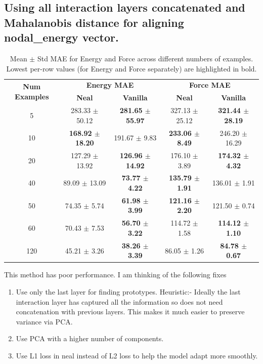\documentclass[12pt]{article}
\theoremstyle{definition}
\theoremstyle{remark}
\begin{document}
\subsection{Using all interaction layers concatenated and Mahalanobis distance for aligning nodal\_energy vector. }
\begin{table}[h!]
\centering
\caption{Mean $\pm$ Std MAE for Energy and Force across different numbers of examples. Lowest per-row values (for Energy and Force separately) are highlighted in bold.}
\renewcommand{\arraystretch}{1.2}
\begin{tabular}{c|cc|cc}
\hline
\multirow{2}{*}{\textbf{Num Examples}} & \multicolumn{2}{c|}{\textbf{Energy MAE}} & \multicolumn{2}{c}{\textbf{Force MAE}} \\
 & \textbf{Neal} & \textbf{Vanilla} & \textbf{Neal} & \textbf{Vanilla} \\
\hline
5   & 283.33 $\pm$ 50.12 & \textbf{281.65 $\pm$ 55.97} & 327.13 $\pm$ 25.12 & \textbf{321.44 $\pm$ 28.19} \\
10  & \textbf{168.92 $\pm$ 18.20} & 191.67 $\pm$ 9.83  & \textbf{233.06 $\pm$ 8.49}  & 246.20 $\pm$ 16.29 \\
20  & 127.29 $\pm$ 13.92 & \textbf{126.96 $\pm$ 14.92} & 176.10 $\pm$ 3.89  & \textbf{174.32 $\pm$ 4.32} \\
40  & 89.09 $\pm$ 13.09  & \textbf{73.77 $\pm$ 4.22}   & \textbf{135.79 $\pm$ 1.91}  & 136.01 $\pm$ 1.91 \\
50  & 74.35 $\pm$ 5.74   & \textbf{61.98 $\pm$ 3.99}   & \textbf{121.16 $\pm$ 2.20}  & 121.50 $\pm$ 0.74 \\
60  & 70.43 $\pm$ 7.53   & \textbf{56.70 $\pm$ 3.22}   & 114.72 $\pm$ 1.58  & \textbf{114.12 $\pm$ 1.10} \\
120 & 45.21 $\pm$ 3.26   & \textbf{38.26 $\pm$ 3.39}   & 86.05 $\pm$ 1.26  & \textbf{84.78 $\pm$ 0.67} \\
\hline
\end{tabular}
\end{table}
This method has poor performance. I am thinking of the following fixes
\begin{enumerate}
    \item Use only the last layer for finding prototypes. Heuristic:- Ideally the last interaction layer has captured all the information so does not need concatenation with previous layers. This makes it much easier to preserve variance via PCA.

    \item Use PCA with a higher number of components.

    \item Use L1 loss in neal instead of L2 loss to help the model adapt more smoothly.
\end{enumerate}
\end{document}
